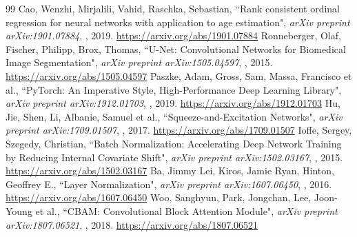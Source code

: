 \begin{thebibliography}{99}
 Cao, Wenzhi, Mirjalili, Vahid, Raschka, Sebastian, ``Rank consistent ordinal regression for neural networks with application to age estimation", \emph{arXiv preprint arXiv:1901.07884}, , 2019. \url{https://arxiv.org/abs/1901.07884}
 Ronneberger, Olaf, Fischer, Philipp, Brox, Thomas, ``U-Net: Convolutional Networks for Biomedical Image Segmentation", \emph{arXiv preprint arXiv:1505.04597}, , 2015. \url{https://arxiv.org/abs/1505.04597}
 Paszke, Adam, Gross, Sam, Massa, Francisco et al., ``PyTorch: An Imperative Style, High-Performance Deep Learning Library", \emph{arXiv preprint arXiv:1912.01703}, , 2019. \url{https://arxiv.org/abs/1912.01703}
 Hu, Jie, Shen, Li, Albanie, Samuel et al., ``Squeeze-and-Excitation Networks", \emph{arXiv preprint arXiv:1709.01507}, , 2017. \url{https://arxiv.org/abs/1709.01507}
 Ioffe, Sergey, Szegedy, Christian, ``Batch Normalization: Accelerating Deep Network Training by Reducing Internal Covariate Shift", \emph{arXiv preprint arXiv:1502.03167}, , 2015. \url{https://arxiv.org/abs/1502.03167}
 Ba, Jimmy Lei, Kiros, Jamie Ryan, Hinton, Geoffrey E., ``Layer Normalization", \emph{arXiv preprint arXiv:1607.06450}, , 2016. \url{https://arxiv.org/abs/1607.06450}
 Woo, Sanghyun, Park, Jongchan, Lee, Joon-Young et al., ``CBAM: Convolutional Block Attention Module", \emph{arXiv preprint arXiv:1807.06521}, , 2018. \url{https://arxiv.org/abs/1807.06521}
\end{thebibliography}